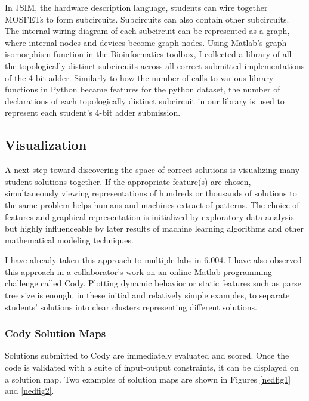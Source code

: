 \documentclass[12pt]{article}
\begin{document}
In JSIM, the hardware description language, students can wire together MOSFETs to form subcircuits. Subcircuits can also contain other subcircuits. The internal wiring diagram of each subcircuit can be represented as a graph, where internal nodes and devices become graph nodes. Using Matlab's graph isomorphism function in the Bioinformatics toolbox, I collected a library of all the topologically distinct subcircuits across all correct submitted implementations of the 4-bit adder. Similarly to how the number of calls to various library functions in Python became features for the python dataset, the number of declarations of each topologically distinct subcircuit in our library is used to represent each student's 4-bit adder submission.


\subsection{Visualization}

A next step toward discovering the space of correct solutions is visualizing many student solutions together. If the appropriate feature(s) are chosen, simultaneously viewing representations of hundreds or thousands of solutions to the same problem helps humans and machines extract of patterns. The choice of features and graphical representation is initialized by exploratory data analysis but highly influenceable by later results of machine learning algorithms and other mathematical modeling techniques. 

I have already taken this approach to multiple labs in 6.004. I have also observed this approach in a collaborator's work on an online Matlab programming challenge called Cody. Plotting dynamic behavior or static features such as parse tree size is enough, in these initial and relatively simple examples, to separate students' solutions into clear clusters representing different solutions. %

\subsubsection{Cody Solution Maps}
Solutions submitted to Cody are immediately evaluated and scored. Once the code is validated with a suite of input-output constraints, it can be displayed on a solution map. Two examples of solution maps are shown in Figures \ref{nedfig1} and \ref{nedfig2}. 
 
\end{document}
